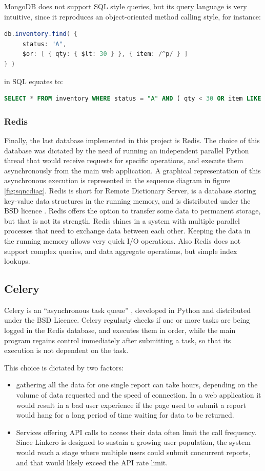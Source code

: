 MongoDB does not support SQL style queries, but its query language is very
intuitive, since it reproduces an object-oriented method calling style, for
instance:
\begin{lstlisting}[language=Java, breaklines=true]
db.inventory.find( {
     status: "A",
     $or: [ { qty: { $lt: 30 } }, { item: /^p/ } ]
} )
\end{lstlisting}
in SQL equates to:
\begin{lstlisting}[language=SQL, breaklines=true]
SELECT * FROM inventory WHERE status = "A" AND ( qty < 30 OR item LIKE "p%")
\end{lstlisting}

\subsubsection{Redis}
Finally, the last database implemented in this project is Redis\texttrademark.
The choice of this database was dictated by the need of running an independent
parallel Python thread that would receive requests for specific operations,
and execute them asynchronously from the main web application. A graphical
representation of this asynchronous execution is represented in the sequence
diagram in figure \ref{fig:sqncdiag}. Redis is short for Remote Dictionary
Server, is a database storing key-value data structures in the running
memory, and is distributed under the BSD licence \cite{Redis}. Redis offers the
option to transfer some data to permanent storage, but that is not its strength.
Redis shines in a system with multiple parallel processes that need to
exchange data between each other. Keeping the data in the running memory allows
very quick I/O operations. Also Redis does not support complex queries, and data
aggregate operations, but simple index lookups.

\subsection{Celery}
Celery is an ``asynchronous task queue'' \cite{Celery}, developed in Python and
distributed under the BSD Licence. Celery regularly checks if one or more tasks
are being logged in the Redis database, and executes them in order, while the
main program regains control immediately after submitting a task, so that its
execution is not dependent on the task.

This choice is dictated by two factors:
\begin{itemize}
  \item gathering all the data for one single report can take hours, depending
  on the volume of data requested and the speed of connection. In a web
  application it would result in a bad user experience if the page used to
  submit a report would hang for a long period of time waiting for data to be
  returned.
  \item Services offering API calls to access their data often limit the call
  frequency. Since Linkero is designed to sustain a growing user population,
  the system would reach a stage where multiple users could submit concurrent
  reports, and that would likely exceed the API rate limit.
\end{itemize}

